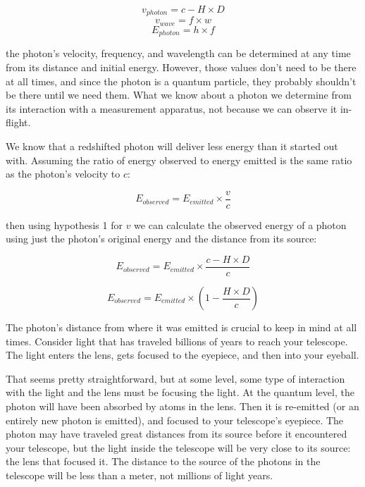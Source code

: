 \documentclass{ws-mpla}
\begin{document}
\begin{equation}
    v_{photon} = c - H \times D
\end{equation}
\begin{equation}
    v_{wave} = f \times w 
\end{equation}
\begin{equation}
    E_{photon} = h \times f 
\end{equation}

the photon's velocity, frequency, and wavelength can be determined at any time from its distance and initial energy. 
However, those values don't need to be there at all times, and since the photon is a quantum particle, they probably shouldn't be there until we need them.
What we know about a photon we determine from its interaction with a measurement apparatus, not because we can observe it in-flight.

We know that a redshifted photon will deliver less energy than it started out with. 
Assuming the ratio of energy observed to energy emitted is the same ratio as the photon's velocity to $c$:

\begin{equation}
E_{observed} = E_{emitted} \times \frac{v}{c} 
\end{equation}

then using hypothesis 1 for $v$ we can calculate the observed energy of a photon using just the photon's original energy and the distance from its source:

\begin{equation}
E_{observed} = E_{emitted} \times \frac{c - H\times D}{c}
\end{equation}

\begin{equation}
E_{observed} = E_{emitted} \times (1 - \frac{H\times D}{c})
\end{equation}

The photon's distance from where it was emitted is crucial to keep in mind at all times. Consider light that has traveled billions of years to reach your telescope. The light enters the lens, gets focused to the eyepiece, and then into your eyeball.

That seems pretty straightforward, but at some level, some type of interaction with the light and the lens must be focusing the light. At the quantum level, the photon will have been absorbed by atoms in the lens. Then it is re-emitted (or an entirely new photon is emitted), and focused to your telescope's eyepiece.
The photon may have traveled great distances from its source before it encountered your telescope, but the light inside the telescope will be very close to its source: the lens that focused it. The distance to the source of the photons in the telescope will be less than a meter, not millions of light years.
\end{document}
